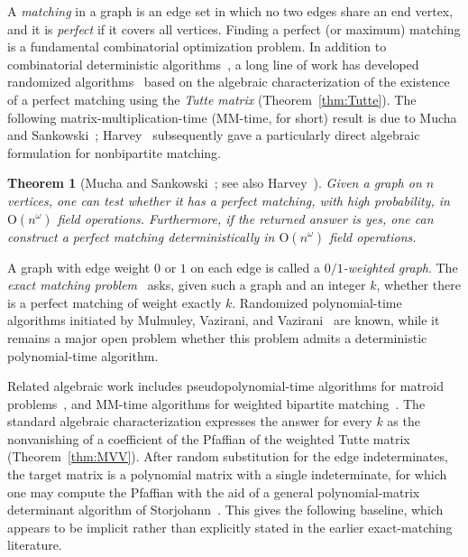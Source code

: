 \documentclass[11pt, a4paper]{article}
\theoremstyle{plain}
\newtheorem{theorem}{Theorem}[section]
\theoremstyle{definition}
\theoremstyle{remark}
\begin{document}
A \emph{matching} in a graph is an edge set in which no two edges share an end vertex, and it is \emph{perfect} if it covers all vertices.
Finding a perfect (or maximum) matching is a fundamental combinatorial optimization problem.
In addition to combinatorial deterministic algorithms~\cite{Edmonds1965a,MV1980,Vazirani2024,GK2004}, a long line of work has developed randomized algorithms~\cite{MVV1987,RV1989,MS2004,Harvey2009} based on the algebraic characterization of the existence of a perfect matching using the \emph{Tutte matrix} (Theorem~\ref{thm:Tutte}).
The following matrix-multiplication-time (MM-time, for short) result is due to Mucha and Sankowski~\cite{MS2004}; Harvey~\cite{Harvey2009} subsequently gave a particularly direct algebraic formulation for nonbipartite matching.

\begin{theorem}[Mucha and Sankowski~\cite{MS2004}; see also Harvey~\cite{Harvey2009}]\label{thm:perfect}
Given a graph on $n$ vertices, one can test whether it has a perfect matching, with high probability, in $\mathrm{O}(n^\omega)$ field operations.
Furthermore, if the returned answer is yes, one can construct a perfect matching deterministically in $\mathrm{O}(n^\omega)$ field operations.
\end{theorem}

A graph with edge weight $0$ or $1$ on each edge is called a \emph{$0/1$-weighted graph}.
The \emph{exact matching problem}~\cite{PY1982} asks, given such a graph and an integer $k$, whether there is a perfect matching of weight exactly $k$.
Randomized polynomial-time algorithms initiated by Mulmuley, Vazirani, and Vazirani~\cite{MVV1987} are known, while it remains a major open problem whether this problem admits a deterministic polynomial-time algorithm.

Related algebraic work includes pseudopolynomial-time algorithms for matroid problems~\cite{CGM1992, CLL2014}, and MM-time algorithms for weighted bipartite matching~\cite{Sankowski2009}.
The standard algebraic characterization expresses the answer for every $k$ as the nonvanishing of a coefficient of the Pfaffian of the weighted Tutte matrix (Theorem~\ref{thm:MVV}).
After random substitution for the edge indeterminates, the target matrix is a polynomial matrix with a single indeterminate, for which one may compute the Pfaffian with the aid of a general polynomial-matrix determinant algorithm of Storjohann~\cite{Storjohann2003}.
This gives the following baseline, which appears to be implicit rather than explicitly stated in the earlier exact-matching literature.
\end{document}
